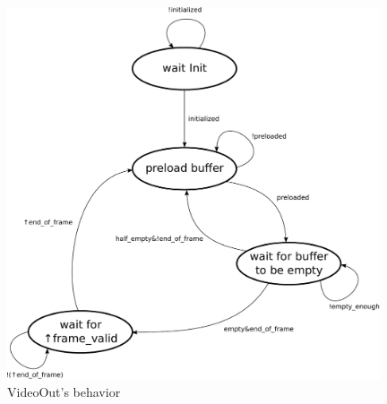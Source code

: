 \begin{figure}[h]
\center
\includegraphics[width=11cm]{figs/video_out_sm.pdf}
\caption{VideoOut's behavior}
\label{VideoOut_behavior}
\end{figure}


